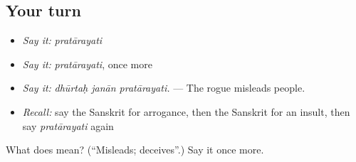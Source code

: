 \subsection*{Your turn}
\begin{itemize}
\raggedright
  \item \emph{Say it:} \emph{pratārayati}
  \item \emph{Say it:} \emph{pratārayati}, once more
  \item \emph{Say it:} \emph{dhūrtaḥ janān pratārayati.} — The rogue misleads people.
  \item \emph{Recall:} say the Sanskrit for arrogance, then the Sanskrit for an insult, then say \emph{pratārayati} again
\end{itemize}

\begin{tcolorbox}[breakable,colback=teal!4,colframe=teal!35!black,title={Before you move on}]
What does  mean? (\textquotedblleft{}Misleads; deceives\textquotedblright{}.) Say it once more.
\end{tcolorbox}
